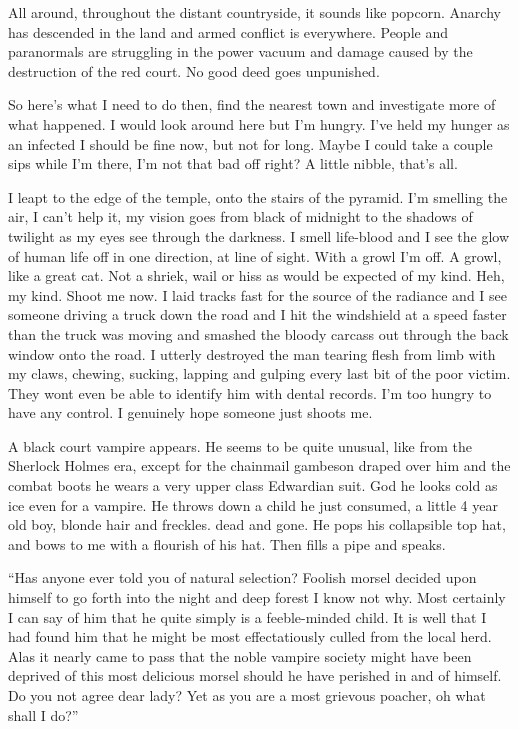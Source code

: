 All around, throughout the distant countryside, it sounds like popcorn. Anarchy has descended in the land and armed conflict is everywhere. People and paranormals are struggling in the power vacuum and damage caused by the destruction of the red court. No good deed goes unpunished.

So here's what I need to do then, find the nearest town and investigate more of what happened. I would look around here but I'm hungry. I've held my hunger as an infected I should be fine now, but not for long. Maybe I could take a couple sips while I'm there, I'm not that bad off right? A little nibble, that's all.

I leapt to the edge of the temple, onto the stairs of the pyramid. I'm smelling the air, I can't help it, my vision goes from black of midnight to the shadows of twilight as my eyes see through the darkness. I smell life-blood and I see the glow of human life off in one direction, at line of sight. With a growl I'm off. A growl, like a great cat. Not a shriek, wail or hiss as would be expected of my kind. Heh, my kind. Shoot me now. I laid tracks fast for the source of the radiance and I see someone driving a truck down the road and I hit the windshield at a speed faster than the truck was moving and smashed the bloody carcass out through the back window onto the road. I utterly destroyed the man tearing flesh from limb with my claws, chewing, sucking, lapping and gulping every last bit of the poor victim. They wont even be able to identify him with dental records. I'm too hungry to have any control. I genuinely hope someone just shoots me.

A black court vampire appears. He seems to be quite unusual, like from the Sherlock Holmes era, except for the chainmail gambeson draped over him and the combat boots he wears a very upper class Edwardian suit. God he looks cold as ice even for a vampire. He throws down a child he just consumed, a little 4 year old boy, blonde hair and freckles. dead and gone. He pops his collapsible top hat, and bows to me with a flourish of his hat. Then fills a pipe and speaks.

``Has anyone ever told you of natural selection? Foolish morsel decided upon himself to go forth into the night and deep forest I know not why. Most certainly I can say of him that he quite simply is a feeble-minded child. It is well that I had found him that he might be most effectatiously culled from the local herd. Alas it nearly came to pass that the noble vampire society might have been deprived of this most delicious morsel should he have perished in and of himself. Do you not agree dear lady? Yet as you are a most grievous poacher, oh what shall I do?''

